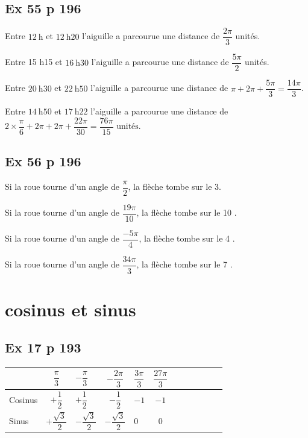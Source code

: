 \documentclass[a4paper,french]{book}
\begin{document}
\subsection*{Ex 55 p 196}

\begin{enumMet}
	\item Entre $12 \mathrm{~h}$ et $12 \mathrm{~h} 20$ l'aiguille a parcourue une distance de $\dfrac{2 \pi}{3}$ unités.
	\item Entre 15 h15 et $16 \mathrm{~h} 30$ l'aiguille a parcourue une distance de $\dfrac{5 \pi}{2}$ unités.
	\item Entre $20 \mathrm{~h} 30$ et $22 \mathrm{~h} 50$ l'aiguille a parcourue une distance de $\pi+2 \pi+\dfrac{5 \pi}{3}=\dfrac{14 \pi}{3}$.
	\item Entre $14 \mathrm{~h} 50$ et $17 \mathrm{~h} 22$ l'aiguille a parcourue une distance de $2 \times \dfrac{\pi}{6}+2 \pi+2 \pi+\dfrac{22 \pi}{30}=\dfrac{76 \pi}{15} \text { unités. }$
\end{enumMet}



\subsection*{Ex 56 p 196}

\begin{enumMet}
	\item Si la roue tourne d'un angle de $\dfrac{\pi}{2}$, la flèche tombe sur le 3.
	\item Si la roue tourne d'un angle de $\dfrac{19 \pi}{10}$, la flèche tombe sur le 10 .
	\item Si la roue tourne d'un angle de $\dfrac{-5 \pi}{4}$, la flèche tombe sur le 4 .
	\item Si la roue tourne d'un angle de $\dfrac{34 \pi}{3}$, la flèche tombe sur le 7 .
\end{enumMet}


\section*{cosinus et sinus}

\subsection*{Ex 17 p 193}

\begin{tabular}{ | Xc | Xc | Xc | Xc | Xc | Xc |}
    \hline
    \   & $\dfrac{\pi}{3}$ & $-\dfrac{\pi}{3}$ & $-\dfrac{2\pi}{3}$ & $\dfrac{3\pi}{3}$ & $\dfrac{27\pi}{3}$ \\ \hline
    Cosinus  & $+\dfrac{1}{2}$ & $+\dfrac{1}{2}$ & $-\dfrac{1}{2}$ & $-1$ & $-1$ \\ \hline
    Sinus & $+\dfrac{\sqrt{3}}{2}$ & $-\dfrac{\sqrt{3}}{2}$ & $-\dfrac{\sqrt{3}}{2}$ & $0$ & $0$ \\
    \hline  
\end{tabular}
\end{document}
